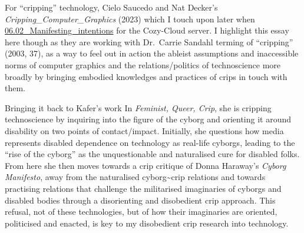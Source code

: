 For ``cripping'' technology, Cielo Saucedo and Nat Decker's
\emph{Cripping\_Computer\_Graphics} (2023) which I touch upon later when
\href{../../06_A\%20Cozier\%20Configure-Ability/06.02_Manifesting_intentions.md}{06.02\_Manifesting\_intentions}
for the Cozy-Cloud server. I highlight this essay here though as they
are working with Dr.~Carrie Sandahl terming of ``cripping'' (2003, 37),
as a way to feel out in action the ableist assumptions and inaccessible
norms of computer graphics and the relations/politics of technoscience
more broadly by bringing embodied knowledges and practices of crips in
touch with them.

Bringing it back to Kafer's work In \emph{Feminist, Queer, Crip}, she is
cripping technoscience by inquiring into the figure of the cyborg and
orienting it around disability on two points of contact/impact.
Initially, she questions how media represents disabled dependence on
technology as real-life cyborgs, leading to the ``rise of the cyborg''
as the unquestionable and naturalised cure for disabled folks. From here
she then moves towards a crip critique of Donna Haraway's \emph{Cyborg
Manifesto}, away from the naturalised cyborg\textasciitilde crip
relations and towards practising relations that challenge the
militarised imaginaries of cyborgs and disabled bodies through a
disorienting and disobedient crip approach. This refusal, not of these
technologies, but of how their imaginaries are oriented, politicised and
enacted, is key to my disobedient crip research into technology.

